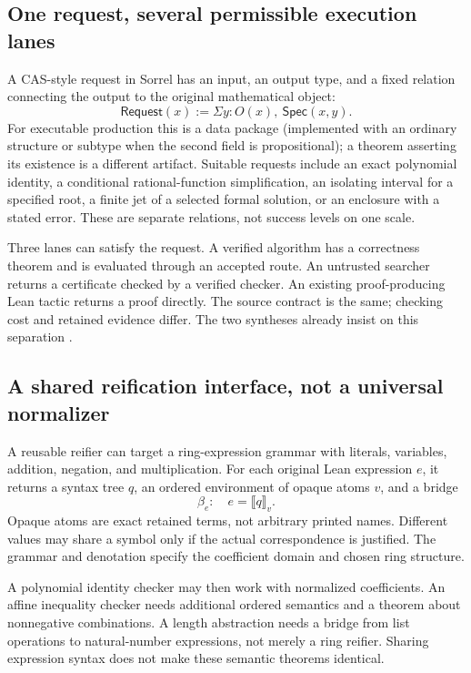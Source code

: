 \documentclass[11pt,a4paper]{article}
\numberwithin{equation}{section}
\theoremstyle{definition}\newtheorem{definition}[theorem]{Definition}
\theoremstyle{remark}\newtheorem{remark}[theorem]{Remark}
\begin{document}
\subsection{One request, several permissible execution lanes}
A CAS-style request in Sorrel has an input, an output type, and a fixed
relation connecting the output to the original mathematical object:
\[
 \mathsf{Request}(x):=\Sigma y:O(x),\ \mathsf{Spec}(x,y).
\]
For executable production this is a data package (implemented with an ordinary
structure or subtype when the second field is propositional); a theorem asserting its
existence is a different artifact. Suitable requests include an exact
polynomial identity, a conditional rational-function simplification, an
isolating interval for a specified root, a finite jet of a selected formal
solution, or an enclosure with a stated error. These are separate relations,
not success levels on one scale.

Three lanes can satisfy the request. A verified algorithm has a correctness
theorem and is evaluated through an accepted route. An untrusted searcher
returns a certificate checked by a verified checker. An existing proof-producing
Lean tactic returns a proof directly. The source contract is the same;
checking cost and retained evidence differ. The two syntheses already insist
on this separation \cite{synA,synB}.

\subsection{A shared reification interface, not a universal normalizer}
A reusable reifier can target a ring-expression grammar with literals,
variables, addition, negation, and multiplication. For each original Lean
expression \(e\), it returns a syntax tree \(q\), an ordered environment of
opaque atoms \(v\), and a bridge
\[
 \beta_e:\quad e=\llbracket q\rrbracket_v.
\]
Opaque atoms are exact retained terms, not arbitrary printed names. Different
values may share a symbol only if the actual correspondence is justified.
The grammar and denotation specify the coefficient domain and chosen ring
structure.

A polynomial identity checker may then work with normalized coefficients.
An affine inequality checker needs additional ordered semantics and a theorem
about nonnegative combinations. A length abstraction needs a bridge from list
operations to natural-number expressions, not merely a ring reifier.
Sharing expression syntax does not make these semantic theorems identical.
\end{document}
